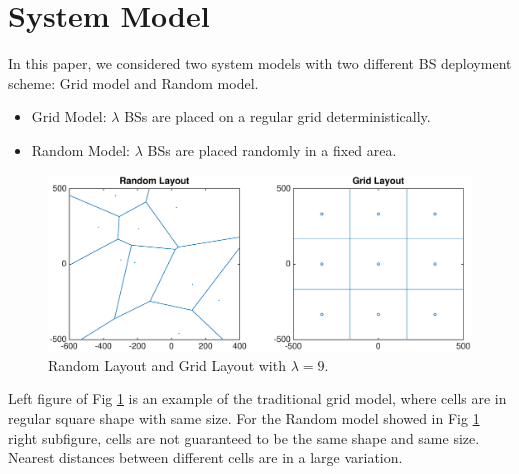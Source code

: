 \section{System Model}
\label{SystemModel}
In this paper, we considered two system models with two different BS deployment scheme: Grid model and Random model.
\begin{itemize}
\item Grid Model: $\lambda$ BSs are placed on a regular grid deterministically.
\item Random Model: $\lambda$ BSs are placed randomly in a fixed area.
\end{itemize}
\begin{figure}
\centering
\includegraphics[width=14cm]{systemLayout.eps}
\caption{Random Layout and Grid Layout with $\lambda = 9$.}
\label{RandomLayout}
\end{figure}
Left figure of Fig \ref{RandomLayout} is an example of the traditional grid model, where cells are in regular square shape with same size. For the Random model showed in Fig \ref{RandomLayout} right subfigure, cells are not guaranteed to be the same shape and same size. Nearest distances between different cells are in a large variation.

